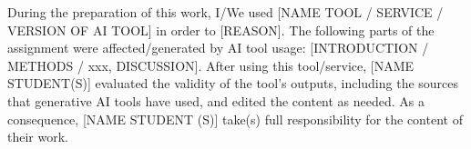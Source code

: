 During the preparation of this work, I/We used [NAME TOOL / SERVICE / VERSION
OF AI TOOL] in order to [REASON]. The following parts of the assignment were
affected/generated by AI tool usage: [INTRODUCTION / METHODS / xxx,
DISCUSSION]. After using this tool/service, [NAME STUDENT(S)] evaluated the
validity of the tool’s outputs, including the sources that generative AI tools have used,
and edited the content as needed. As a consequence, [NAME STUDENT (S)] take(s)
full responsibility for the content of their work.
